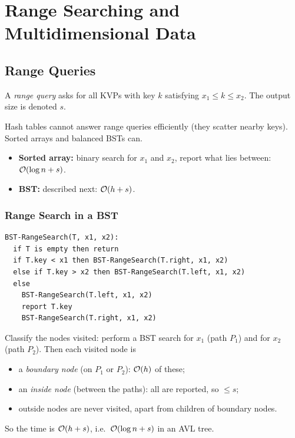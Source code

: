 \chapter{Range Searching and Multidimensional Data}

\section{Range Queries}

\begin{definition}
A \emph{range query}  asks for all KVPs with key $k$
satisfying $x_1 \le k \le x_2$. The output size is denoted $s$.
\end{definition}

Hash tables cannot answer range queries efficiently (they scatter nearby keys).
Sorted arrays and balanced BSTs can.
\begin{itemize}
  \item \textbf{Sorted array:} binary search for $x_1$ and $x_2$, report what lies
        between: $\mathcal{O}(\log n + s)$.
  \item \textbf{BST:} described next: $\mathcal{O}(h + s)$.
\end{itemize}

\subsection{Range Search in a BST}

\begin{lstlisting}
BST-RangeSearch(T, x1, x2):
  if T is empty then return
  if T.key < x1 then BST-RangeSearch(T.right, x1, x2)
  else if T.key > x2 then BST-RangeSearch(T.left, x1, x2)
  else
    BST-RangeSearch(T.left, x1, x2)
    report T.key
    BST-RangeSearch(T.right, x1, x2)
\end{lstlisting}

Classify the nodes visited: perform a BST search for $x_1$ (path $P_1$) and for
$x_2$ (path $P_2$). Then each visited node is
\begin{itemize}
  \item a \emph{boundary node} (on $P_1$ or $P_2$): $\mathcal{O}(h)$ of these;
  \item an \emph{inside node} (between the paths): all are reported, so $\le s$;
  \item outside nodes are never visited, apart from children of boundary nodes.
\end{itemize}
So the time is $\mathcal{O}(h + s)$, i.e.\ $\mathcal{O}(\log n + s)$ in an AVL tree.

